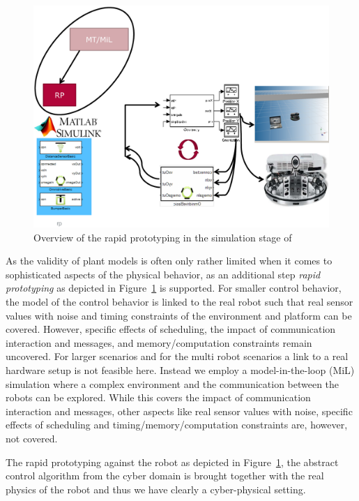 \begin{figure}[!htb]
\centering
\includegraphics[scale=0.33]{figures/rp.pdf}
\caption{Overview of the rapid prototyping in the simulation stage of \cite{Broekman&Notenboom2003}}
\label{fig:rp}
\end{figure}



%
As the validity of plant models is often only rather limited when it comes to sophisticated aspects of the physical behavior, as an additional step \emph{rapid prototyping} as depicted in  Figure~\ref{fig:rp} is supported. 
%
For smaller control behavior, the model of the control behavior is linked to the real robot such that real sensor values with noise and timing constraints of the environment and platform can be covered. However, specific effects of scheduling, the impact of communication interaction and messages, and memory/computation constraints remain uncovered.
%
For larger scenarios and for the multi robot scenarios a link to a real hardware setup is not feasible here. Instead we employ a model-in-the-loop (MiL) simulation where a complex environment and the communication between the robots can be explored. While this covers the impact of communication interaction and messages, other aspects like real sensor values with noise, specific effects of scheduling and timing/memory/computation constraints are, however, not covered.

%
The rapid prototyping against the robot as depicted in Figure~\ref{fig:rp}, the abstract control algorithm from the cyber domain is brought together with the real physics of the robot  and thus we have clearly a cyber-physical setting. 

